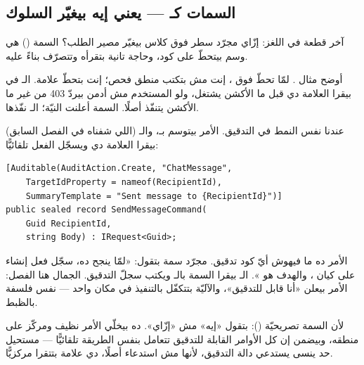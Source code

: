 \subsection{السمات كـ — يعني إيه  بيغيّر السلوك}

آخر قطعة في اللغز: إزّاي مجرّد سطر فوق كلاس بيغيّر مصير الطلب؟ السمة () هي وسم بيتحطّ على كود، وحاجة تانية بتقرأه وتتصرّف بناءً عليه.

أوضح مثال \code{[Authorize]}. لمّا تحطّ \code{[Authorize(Roles = "Admin")]} فوق ، إنت مش بتكتب منطق فحص؛ إنت بتحطّ علامة. الـ في  بيقرا العلامة دي قبل ما الأكشن يشتغل، ولو المستخدم مش أدمن بيردّ 403 من غير ما الأكشن يتنفّذ أصلًا. السمة أعلنت النيّة؛ الـ نفّذها.

عندنا نفس النمط في التدقيق. الأمر بيتوسم بـ\code{[Auditable]}، والـ (اللي شفناه في الفصل السابق) بيقرا العلامة دي ويسجّل الفعل تلقائيًّا:

\begin{english}
\begin{lstlisting}[language={[Sharp]C}]
[Auditable(AuditAction.Create, "ChatMessage",
    TargetIdProperty = nameof(RecipientId),
    SummaryTemplate = "Sent message to {RecipientId}")]
public sealed record SendMessageCommand(
    Guid RecipientId,
    string Body) : IRequest<Guid>;
\end{lstlisting}
\end{english}

الأمر ده ما فيهوش أيّ كود تدقيق. مجرّد سمة \code{[Auditable]} بتقول: «لمّا ينجح ده، سجّل فعل إنشاء على كيان ، والهدف هو ». الـ بيقرا السمة بالـ ويكتب سجلّ التدقيق. الجمال هنا الفصل: الأمر بيعلن «أنا قابل للتدقيق»، والآليّة بتتكفّل بالتنفيذ في مكان واحد — نفس فلسفة \code{[Authorize]} بالظبط.

\begin{qa}
لأن السمة تصريحيّة (): بتقول «إيه» مش «إزّاي». ده بيخلّي الأمر نظيف ومركّز على منطقه، وبيضمن إن كل الأوامر القابلة للتدقيق تتعامل بنفس الطريقة تلقائيًّا — مستحيل حد ينسى يستدعي دالة التدقيق، لأنها مش استدعاء أصلًا، دي علامة بتتقرا مركزيًّا.
\end{qa}

